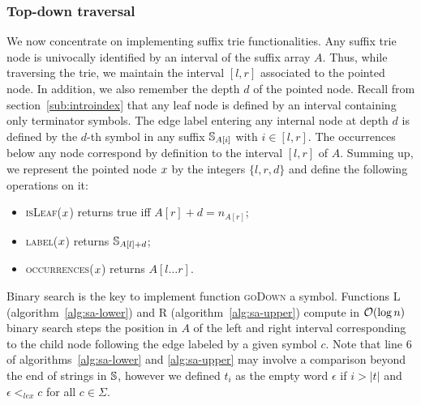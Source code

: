 \subsubsection{Top-down traversal}

We now concentrate on implementing suffix trie functionalities.
Any suffix trie node is univocally identified by an interval of the suffix array $A$.
Thus, while traversing the trie, we maintain the interval $[l,r]$ associated to the pointed node.
In addition, we also remember the depth $d$ of the pointed node.
Recall from section~\ref{sub:introindex} that any leaf node is defined by an interval containing only terminator symbols.
The edge label entering any internal node at depth $d$ is defined by the $d$-th symbol in any suffix $\mathbb {S}_{A[i]}$ with $i \in [l,r]$.
The occurrences below any node correspond by definition to the interval $[l,r]$ of $A$.
Summing up, we represent the pointed node $x$ by the integers $\{ l, r ,d \}$ and define the following operations on it:
\begin{itemize}
\item \textsc{isLeaf}($x$) returns true iff $A[r] + d = n_{A[r]}$;
\item \textsc{label}($x$) returns $\mathbb {S}_{A[l] + d}$;
\item \textsc{occurrences}($x$) returns $A[l \dots r]$.
\end{itemize}

Binary search is the key to implement function \textsc{goDown} a symbol.
Functions \textsc{L} (algorithm~\ref{alg:sa-lower}) and \textsc{R} (algorithm~\ref{alg:sa-upper}) compute in $\mathcal{O}(\log{n})$ binary search steps the position in $A$ of the left and right interval corresponding to the child node following the edge labeled by a given symbol $c$.
Note that line 6 of algorithms~\ref{alg:sa-lower} and \ref{alg:sa-upper} may involve a comparison beyond the end of strings in $\mathbb {S}$, however we defined $t_i$ as the empty word $\epsilon$ if $i > |t|$ and $\epsilon <_{lex} c$ for all $c \in \Sigma$.


